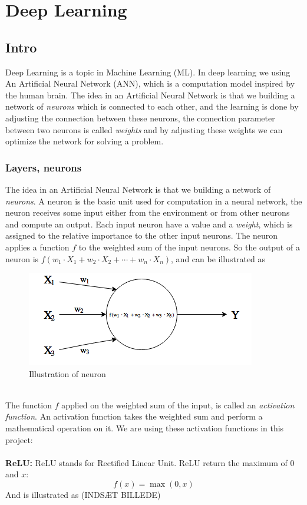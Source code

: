 \documentclass[11pt]{article}
\begin{document}
\maketitle

\section{Deep Learning}


\subsection{Intro}

Deep Learning is a topic in Machine Learning (ML). In deep learning we using An Artificial Neural Network (ANN), which is a computation model inspired by the human brain. The idea in an Artificial Neural Network is that we building a network of \textit{neurons} which is connected to each other, and the learning is done by adjusting the connection between these neurons, the connection parameter between two neurons is called \textit{weights} and by adjusting these weights we can optimize the network for solving a problem.


\subsubsection{Layers, neurons}

The idea in an Artificial Neural Network is that we building a network of \textit{neurons}. A neuron is the basic unit used for computation in a neural network, the neuron receives some input either from the environment or from other neurons and compute an output. Each input neuron have a value and a \textit{weight}, which is assigned to the relative importance to the other input neurons. The neuron applies a function $f$ to the weighted sum of the input neurons. So the output of a neuron is $f(w_{1} \cdot X_{1} + w_{2} \cdot X_{2} + \cdots + w_{n} \cdot X_{n})$, and can be illustrated as
\begin{figure}[!h]
    \centering
    \includegraphics[scale = 0.5]{include/neuron.png}
    \caption{Illustration of neuron}
    \label{fig:neuron}
\end{figure}
\\
The function $f$ applied on the weighted sum of the input, is called an \textit{activation function}. An activation function takes the weighted sum and perform a mathematical operation on it. We are using these activation functions in this project:
\\ \\
\textbf{ReLU:} ReLU stands for Rectified Linear Unit. ReLU return the maximum of $0$ and $x$:
\begin{equation}
f(x)=\max(0,x)
\end{equation}
And is illustrated as
(INDSÆT BILLEDE)
\end{document}
